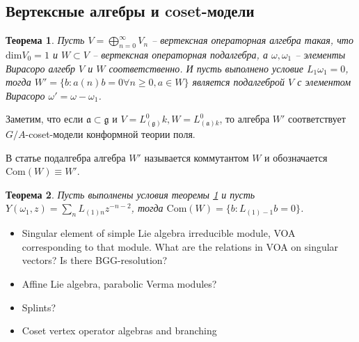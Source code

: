 \documentclass[12pt]{article}
\newtheorem{theorem}{Теорема}
\newcommand{\gf}{\mathfrak{g}}
\newcommand{\af}{\mathfrak{a}}
\begin{document}
\subsection{Вертексные алгебры и coset-модели}
\label{sec:coset-models}

\begin{theorem}
\label{thm:cosets}
  Пусть $V=\bigoplus_{n=0}^{\infty} V_n$ -- вертексная операторная алгебра
  такая, что $\mathrm{dim}V_0=1$ и $W\subset V$ -- вертексная операторная
  подалгебра, а $\omega,\omega_1$ -- элементы Вирасоро алгебр $V$ и $W$
  соответственно. И пусть выполнено условие $L_1\omega_1 =0$, тогда $W'=\{b:
  a(n)b=0 \forall n\geq 0, a\in W\}$ является подалгеброй $V$ с элементом
  Вирасоро $\omega'=\omega-\omega_1$.
\end{theorem}
Заметим, что если $\af\subset\gf$ и $V=L^0_{(\gf)}k, W=L^0_{(\af)k}$, то алгебра
$W'$ соответствует $G/A$-coset-модели конформной теории поля. 

В статье \cite{frenkel1992vertex} подалгебра алгебра $W'$ называется коммутантом
$W$ и обозначается $\mathrm{Com}(W)\equiv W'$.
\begin{theorem}
  Пусть выполнены условия теоремы \ref{thm:cosets} и пусть $Y(\omega_1,z)=\sum_n
  L_{(1)n} z^{-n-2}$, тогда $\mathrm{Com}(W)=\{b: L_{(1)-1}b=0\}$. 
\end{theorem}
\begin{itemize}
\item Singular element of simple Lie algebra irreducible module, VOA corresponding to that module.
  What are the relations in VOA on singular vectors? Is there BGG-resolution?
\item Affine Lie algebra, parabolic Verma modules?
\item Splints?
\item Coset vertex operator algebras and branching
\end{itemize}

{}

\end{document}
